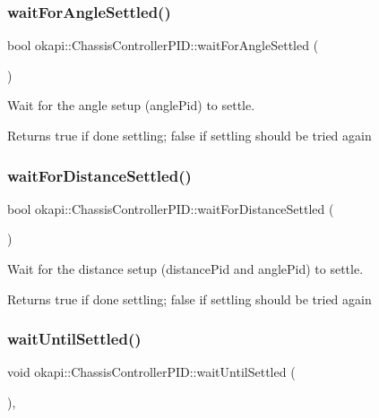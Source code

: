 \subsubsection{\texorpdfstring{waitForAngleSettled()}{waitForAngleSettled()}}
{\footnotesize\ttfamily bool okapi\+::\+Chassis\+Controller\+P\+I\+D\+::wait\+For\+Angle\+Settled (\begin{DoxyParamCaption}{ }\end{DoxyParamCaption})\hspace{0.3cm}{\ttfamily [protected]}}

Wait for the angle setup (angle\+Pid) to settle.

\begin{DoxyReturn}{Returns}
true if done settling; false if settling should be tried again 
\end{DoxyReturn}
\mbox{\label{classokapi_1_1ChassisControllerPID_a991349bc2dad71324203d4b298edd845}} 
\subsubsection{\texorpdfstring{waitForDistanceSettled()}{waitForDistanceSettled()}}
{\footnotesize\ttfamily bool okapi\+::\+Chassis\+Controller\+P\+I\+D\+::wait\+For\+Distance\+Settled (\begin{DoxyParamCaption}{ }\end{DoxyParamCaption})\hspace{0.3cm}{\ttfamily [protected]}}

Wait for the distance setup (distance\+Pid and angle\+Pid) to settle.

\begin{DoxyReturn}{Returns}
true if done settling; false if settling should be tried again 
\end{DoxyReturn}
\mbox{\label{classokapi_1_1ChassisControllerPID_a964cc8132bfa76492df0ee06aadb255a}} 
\subsubsection{\texorpdfstring{waitUntilSettled()}{waitUntilSettled()}}
{\footnotesize\ttfamily void okapi\+::\+Chassis\+Controller\+P\+I\+D\+::wait\+Until\+Settled (\begin{DoxyParamCaption}{ }\end{DoxyParamCaption})\hspace{0.3cm}{\ttfamily [override]}, {\ttfamily [virtual]}}


